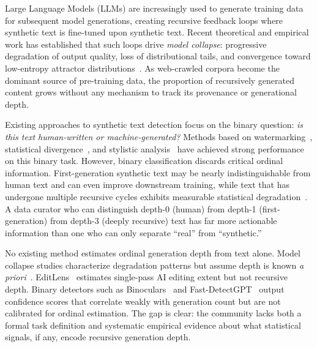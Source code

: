 \documentclass[11pt,a4paper]{article}
\begin{document}
Large Language Models (LLMs) are increasingly used to generate training data for subsequent model generations, creating recursive feedback loops where synthetic text is fine-tuned upon synthetic text. Recent theoretical and empirical work has established that such loops drive \emph{model collapse}: progressive degradation of output quality, loss of distributional tails, and convergence toward low-entropy attractor distributions~\citep{shumailov2024model,alemohammad2024selfconsuming,dohmatob2024tale,gerstgrasser2024model}. As web-crawled corpora become the dominant source of pre-training data, the proportion of recursively generated content grows without any mechanism to track its provenance or generational depth.

Existing approaches to synthetic text detection focus on the binary question: \emph{is this text human-written or machine-generated?} Methods based on watermarking~\citep{kirchenbauer2023watermark}, statistical divergence~\citep{hans2024binoculars,bao2024fastdetectgpt}, and stylistic analysis~\citep{uchendu2020authorship} have achieved strong performance on this binary task. However, binary classification discards critical ordinal information. First-generation synthetic text may be nearly indistinguishable from human text and can even improve downstream training, while text that has undergone multiple recursive cycles exhibits measurable statistical degradation~\citep{drayson2025emnlp}. A data curator who can distinguish depth-0 (human) from depth-1 (first-generation) from depth-3 (deeply recursive) text has far more actionable information than one who can only separate ``real'' from ``synthetic.''

No existing method estimates ordinal generation depth from text alone. Model collapse studies characterize degradation patterns but assume depth is known \emph{a priori}~\citep{shumailov2024model,drayson2025emnlp}. EditLens~\citep{stella2023editlens} estimates single-pass AI editing extent but not recursive depth. Binary detectors such as Binoculars~\citep{hans2024binoculars} and Fast-DetectGPT~\citep{bao2024fastdetectgpt} output confidence scores that correlate weakly with generation count but are not calibrated for ordinal estimation. The gap is clear: the community lacks both a formal task definition and systematic empirical evidence about what statistical signals, if any, encode recursive generation depth.
\end{document}
